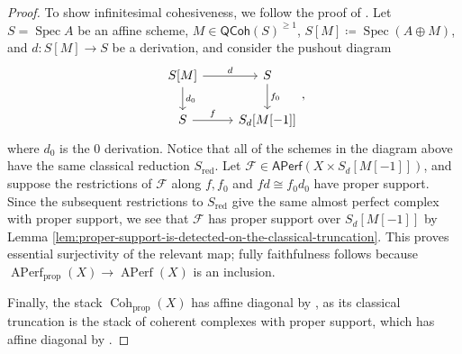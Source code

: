 \documentclass{article}
\numberwithin{equation}{section}
\theoremstyle{quest}
\theoremstyle{definition}
\theoremstyle{remark}
\DeclareMathOperator{\Spec}{Spec}
\DeclareMathOperator{\Coh}{Coh}
\DeclareMathOperator{\APerf}{APerf}
\begin{document}
\begin{proof}
	To show infinitesimal cohesiveness, we follow the proof of \cite[Lemma 2.13]{PS}. Let $S=\Spec A$ be an affine scheme, $M\in \mathsf{QCoh}(S)^{\ge 1}$, $S[M]\coloneqq \Spec(A\oplus M)$, and $d:S[M]\to S$ be a derivation, and consider the pushout diagram
	\[
	\begin{tikzcd}
		S[M]\arrow[r,"d"]\arrow[d,"d_0"]&S\arrow[d,"f_0"]\\
		S\arrow[r,"f"]&S_d[M[-1]]
	\end{tikzcd},
	\] 
	where $d_0$ is the 0 derivation. Notice that all of the schemes in the diagram above have the same classical reduction $S_{\text{red}}$. Let $\mathscr{F}\in \mathsf{APerf}(X\times S_d[M[-1]])$, and suppose the restrictions of $\mathscr{F}$ along $f,f_0$ and $fd\cong f_0d_0$ have proper support. Since the subsequent restrictions to $S_{\text{red}}$ give the same almost perfect complex with proper support, we see that $\mathscr{F}$ has proper support over $S_d[M[-1]]$ by Lemma \ref{lem:proper-support-is-detected-on-the-classical-truncation}. This proves essential surjectivity of the relevant map; fully faithfulness follows because $\APerf_{\text{prop}}(X)\to \APerf(X)$ is an inclusion.

	Finally, the stack $\Coh_{\text{prop}}(X)$ has affine diagonal by \cite[Chapter 2 Corollary 3.2.8]{GR}, as its classical truncation is the stack of coherent complexes with proper support, which has affine diagonal by \cite[Tag 0DLY]{stacks}. 
\end{proof} 
 
\end{document}
